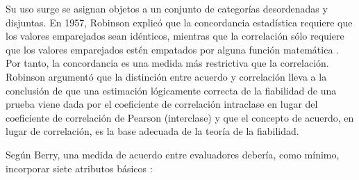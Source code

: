 \documentclass[12pt,a4paper,]{book}
\numberwithin{dummy}{section}
\theoremstyle{ocrenumbox}
\theoremstyle{blacknumex}
\theoremstyle{blacknumbox}
\theoremstyle{ocrenum}
\theoremstyle{ocrenum}
\begin{document}
Su uso surge se asignan objetos a un conjunto de categorías desordenadas
y disjuntas. En 1957, Robinson explicó que la concordancia estadística
requiere que los valores emparejados sean idénticos, mientras que la
correlación sólo requiere que los valores emparejados estén empatados
por alguna función matemática \citep{Robinson1957}. Por tanto, la
concordancia es una medida más restrictiva que la correlación. Robinson
argumentó que la distinción entre acuerdo y correlación lleva a la
conclusión de que una estimación lógicamente correcta de la fiabilidad
de una prueba viene dada por el coeficiente de correlación intraclase en
lugar del coeficiente de correlación de Pearson (interclase) y que el
concepto de acuerdo, en lugar de correlación, es la base adecuada de la
teoría de la fiabilidad.

Según Berry, una medida de acuerdo entre evaluadores debería, como
mínimo, incorporar siete atributos básicos \citep{Berry1988}:
\end{document}
